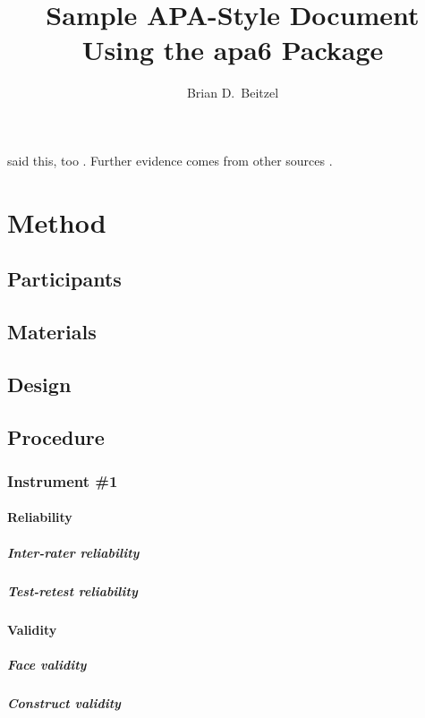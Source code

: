 \documentclass[man]{apa6}
\title{Sample APA-Style Document Using the \textsf{apa6} Package}
\author{Brian D.\ Beitzel}
\affiliation{SUNY Oneonta}
\begin{document}
	\maketitle
	\lipsum[2]
	
	\Textcite{vonDavier2011} said this,
	too \parencite{vonDavier2011,Lassen2006}.  Further evidence comes from
	other sources \parencite{Shotton1989,Lassen2006}.  \lipsum[3]
	
	\section{Method}
	\subsection{Participants}
	\lipsum[4]
	
	\subsection{Materials}
	\lipsum[5]
	
	\subsection{Design}
	\lipsum[6]
	
	\subsection{Procedure}
	\lipsum[7]
	
	\subsubsection{Instrument \#1}
	\lipsum[8]
	
	\paragraph{Reliability}
	\lipsum[9]
	
	\subparagraph{Inter-rater reliability}
	\lipsum[10]
	
	\subparagraph{Test-retest reliability}
	\lipsum[11]
	
	\paragraph{Validity}
	\lipsum[12]
	
	\subparagraph{Face validity}
	\lipsum[13]
	
	\subparagraph{Construct validity}
	\lipsum[14]
	
\end{document}

